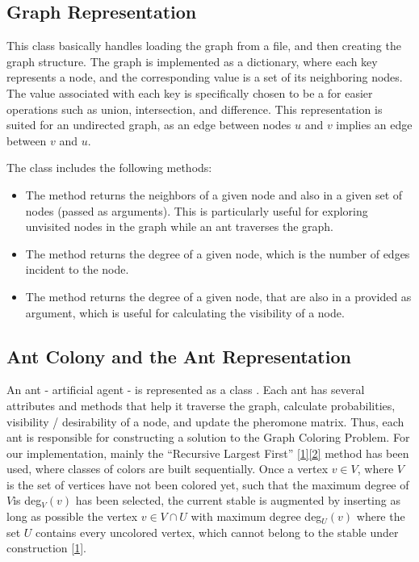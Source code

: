 \documentclass{article}
\theoremstyle{mytheoremstyle}
\theoremstyle{mytheoremstyle}
\theoremstyle{myproblemstyle}
\begin{document}
\subsection{Graph Representation}
This class basically handles loading the graph from a file, and then creating the graph structure. The graph is implemented as a dictionary, where each key represents a node, and the corresponding value is a set of its neighboring nodes. The value associated with each key is specifically chosen to be a  for easier operations such as union, intersection, and difference. This representation is suited for an undirected graph, as an edge between nodes $u$ and $v$ implies an edge between $v$ and $u$.

The  class includes the following methods:
\begin{itemize}
    \item The  method returns the neighbors of a given node and also in a given set of nodes (passed as arguments). This is particularly useful for exploring unvisited nodes in the graph while an ant traverses the graph.
    \item The  method returns the degree of a given node, which is the number of edges incident to the node.
    \item The  method returns the degree of a given node, that are also in a  provided as argument, which is useful for calculating the visibility of a node.
\end{itemize}

\subsection{Ant Colony and the Ant Representation}
An ant - artificial agent - is represented as a class . Each ant has several attributes and methods that help it traverse the graph, calculate probabilities, visibility / desirability of a node, and update the pheromone matrix. Thus, each ant is responsible for constructing a solution to the Graph Coloring Problem. For our implementation, mainly the ``Recursive Largest First'' \hyperlink{refpaper}{[1]}\hyperlink{rlfmethod}{[2]} method has been used, where classes of colors are built sequentially. Once a vertex $v \in V$, where $V$ is the set of vertices have not been colored yet, such that the maximum degree of $V$is deg$_V(v)$ has been selected, the current stable is augmented by inserting as long as possible the vertex $ v \in V \cap U $ with maximum degree deg$_U(v)$ where the set $U$ contains every uncolored vertex, which cannot belong to the stable under construction \hyperlink{refpaper}{[1]}.
\end{document}
